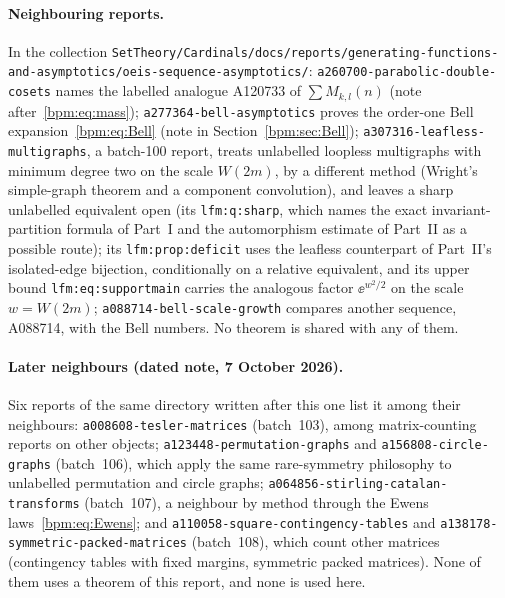 \documentclass[11pt,a4paper]{article}
\theoremstyle{remark}\newtheorem{remark}[theorem]{Remark}%
\begin{document}
\paragraph{Neighbouring reports.} In the collection
\nolinkurl{SetTheory/Cardinals/docs/reports/generating-functions-and-asymptotics/oeis-sequence-asymptotics/}:
\nolinkurl{a260700-parabolic-double-cosets} names the labelled analogue
A120733 of $\sum M_{k,l}(n)$ (note after~\eqref{bpm:eq:mass});
\nolinkurl{a277364-bell-asymptotics} proves the order-one Bell
expansion~\eqref{bpm:eq:Bell} (note in Section~\ref{bpm:sec:Bell});
\nolinkurl{a307316-leafless-multigraphs}, a batch-100 report, treats unlabelled
loopless multigraphs with minimum degree two on the scale $W(2m)$, by a
different method (Wright's simple-graph theorem and a component
convolution), and leaves a sharp unlabelled equivalent open (its
\texttt{lfm:q:sharp}, which names the exact invariant-partition formula of
Part~I and the automorphism estimate of Part~II as a possible route); its
\texttt{lfm:prop:deficit} uses the leafless counterpart of Part~II's
isolated-edge bijection, conditionally on a relative equivalent, and its
upper bound \texttt{lfm:eq:supportmain} carries the analogous factor
$\ee^{w^2/2}$ on the scale $w=W(2m)$;
\nolinkurl{a088714-bell-scale-growth} compares another sequence, A088714, with
the Bell numbers. No theorem is shared with any of them.

\paragraph{Later neighbours (dated note, 7 October 2026).} Six reports of the
same directory written after this one list it among their neighbours:
\nolinkurl{a008608-tesler-matrices} (batch~103), among matrix-counting
reports on other objects; \nolinkurl{a123448-permutation-graphs} and
\nolinkurl{a156808-circle-graphs} (batch~106), which apply the same
rare-symmetry philosophy to unlabelled permutation and circle graphs;
\nolinkurl{a064856-stirling-catalan-transforms} (batch~107), a neighbour by
method through the Ewens laws~\eqref{bpm:eq:Ewens}; and
\nolinkurl{a110058-square-contingency-tables} and
\nolinkurl{a138178-symmetric-packed-matrices} (batch~108), which count other
matrices (contingency tables with fixed margins, symmetric packed matrices).
None of them uses a theorem of this report, and none is used here.
\end{document}
